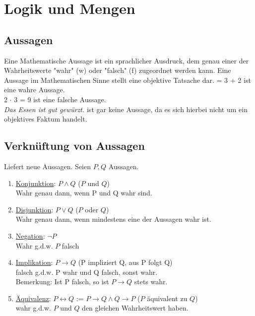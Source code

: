 %
\chapter{Logik und Mengen}
\section*{Aussagen}
Eine Mathematische Aussage ist ein sprachlicher Ausdruck, dem genau einer der Wahrheitswerte "wahr" (w) oder "falsch" (f) zugeordnet werden kann. Eine Aussage im Mathematischen Sinne stellt eine objektive Tatsache dar.
 = 3 + 2 ist eine wahre Aussage.\\
2 $\cdot$ 3 = 9 ist eine falsche Aussage.\\
\textit{Das Essen ist gut gewürzt.} ist gar keine Aussage, da es sich hierbei nicht um ein objektives Faktum handelt.
\section{Verknüftung von Aussagen}
Liefert neue Aussagen. Seien $P, Q$ Aussagen.
\begin{enumerate}
\item \underline{Konjunktion}: $P \wedge Q$ ($P$ und $Q$)\\
Wahr genau dann, wenn P und Q wahr sind.
\item \underline{Disjunktion}: $P \vee Q$ ($P$ oder $Q$)\\
Wahr genau dann, wenn mindestens eine der Aussagen wahr ist.
\item \underline{Negation}: $\neg P$\\
Wahr g.d.w. $P$ falsch
\item \underline{Implikation}: $P \to Q$ (P impliziert Q, aus P folgt Q)\\
falsch g.d.w. P wahr und Q falsch, sonst wahr.\\
Bemerkung: Ist P falsch, so ist $P \to Q$ stets wahr.
\item \underline{Äquivalenz}: $P \leftrightarrow Q$ :=  $P \to Q \wedge Q \to P$ ($P$ äquivalent zu $Q$)\\
wahr g.d.w. $P$ und $Q$ den gleichen Wahrheitswert haben.
\end{enumerate}
